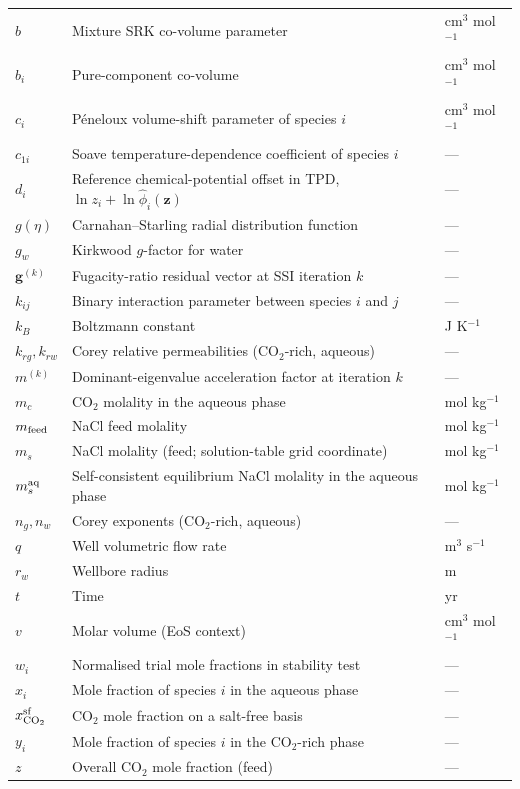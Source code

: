 \documentclass[preprint,12pt,authoryear]{elsarticle}
\begin{document}
\begin{longtable}{@{}p{}p{}p{}@{}}
  $b$ & Mixture SRK co-volume parameter & cm$^3$ mol$^{-1}$ \\
  $b_i$ & Pure-component co-volume & cm$^3$ mol$^{-1}$ \\
  $c_i$ & Péneloux volume-shift parameter of species $i$ & cm$^3$ mol$^{-1}$ \\
  $c_{1i}$ & Soave temperature-dependence coefficient of species $i$ & --- \\
  $d_i$ & Reference chemical-potential offset in TPD, $\ln z_i + \ln\hat{\phi}_i(\mathbf{z})$ & --- \\
  $g(\eta)$ & Carnahan--Starling radial distribution function & --- \\
  $g_w$ & Kirkwood $g$-factor for water & --- \\
  $\mathbf{g}^{(k)}$ & Fugacity-ratio residual vector at SSI iteration $k$ & --- \\
  $k_{ij}$ & Binary interaction parameter between species $i$ and $j$ & --- \\
  $k_B$ & Boltzmann constant & J K$^{-1}$ \\
  $k_{rg}, k_{rw}$ & Corey relative permeabilities (CO$_2$-rich, aqueous) & --- \\
  $m^{(k)}$ & Dominant-eigenvalue acceleration factor at iteration $k$ & --- \\
  $m_c$ & CO$_2$ molality in the aqueous phase & mol kg$^{-1}$ \\
  $m_{\rm feed}$ & NaCl feed molality & mol kg$^{-1}$ \\
  $m_s$ & NaCl molality (feed; solution-table grid coordinate) & mol kg$^{-1}$ \\
  $m_s^{\rm aq}$ & Self-consistent equilibrium NaCl molality in the aqueous phase & mol kg$^{-1}$ \\
  $n_g, n_w$ & Corey exponents (CO$_2$-rich, aqueous) & --- \\
  $q$ & Well volumetric flow rate & m$^3$ s$^{-1}$ \\
  $r_w$ & Wellbore radius & m \\
  $t$ & Time & yr \\
  $v$ & Molar volume (EoS context) & cm$^3$ mol$^{-1}$ \\
  $w_i$ & Normalised trial mole fractions in stability test & --- \\
  $x_i$ & Mole fraction of species $i$ in the aqueous phase & --- \\
  $x_{\rm CO_2}^{\rm sf}$ & CO$_2$ mole fraction on a salt-free basis & --- \\
  $y_i$ & Mole fraction of species $i$ in the CO$_2$-rich phase & --- \\
  $z$ & Overall CO$_2$ mole fraction (feed) & --- \\
\end{longtable}
\end{document}
